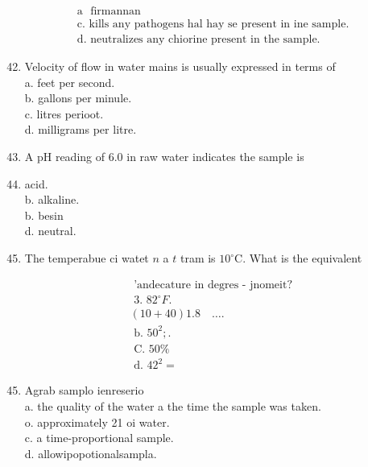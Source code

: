 \documentclass[10pt]{article}
\begin{document}
$$
\begin{aligned}
& \text { a } \text { firmannan } \\
& \text { c. kills any pathogens hal hay se present in ine sample. } \\
& \text { d. neutralizes any chiorine present in the sample. }
\end{aligned}
$$

\begin{enumerate}
  \setcounter{enumi}{41}
  \item Velocity of flow in water mains is usually expressed in terms of\\
a. feet per second.\\
b. gallons per minule.\\
c. litres perioot.\\
d. milligrams per litre.

  \item A pH reading of $6.0$ in raw water indicates the sample is

  \item acid.\\
b. alkaline.\\
b. besin\\
d. neutral.

  \item The temperabue ci watet $n$ a $t$ tram is $10^{\circ} \mathrm{C}$. What is the equivalent

\end{enumerate}

$$
\begin{aligned}
& \text { 'andecature in degres - jnomeit? } \\
& \text { 3. } 82^{\circ} F \text {. } \\
& (10+40) 1.8 \quad \ldots . \\
& \text { b. } 50^{2} ; \text {. } \\
& \text { C. } 50 \% \\
& \text { d. } 42^{2}=
\end{aligned}
$$

\begin{enumerate}
  \setcounter{enumi}{44}
  \item Agrab samplo ienreserio\\
a. the quality of the water a the time the sample was taken.\\
o. approximately 21 oi water.\\
c. a time-proportional sample.\\
d. allowipopotionalsampla.
\end{enumerate}
\end{document}
